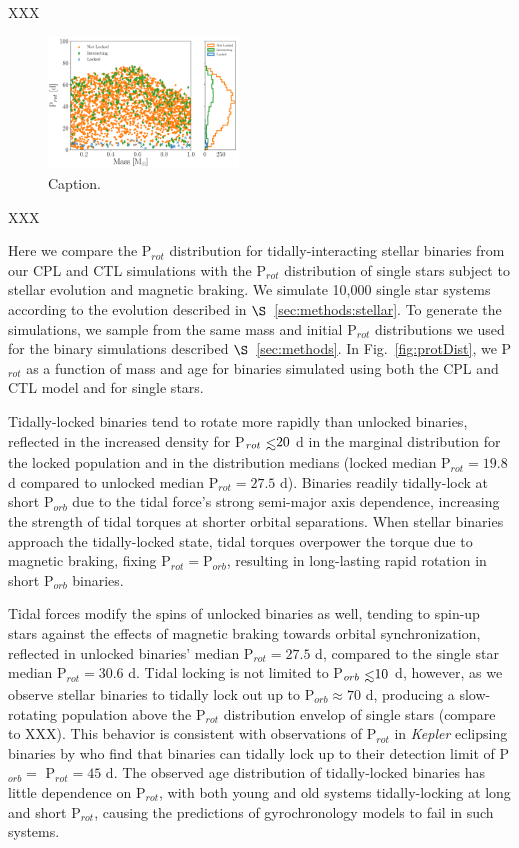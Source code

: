 \documentclass[twocolumn]{aastex61}
\def\lsim{~\rlap{$<$}{\lower 1.0ex\hbox{$\sim$}}}
\newcommand{\kepler}[0]{\textit{Kepler}\xspace}
\begin{document}
XXX

\begin{figure}
	\includegraphics[width=0.45\textwidth]{../Plots/lockedCTL.pdf}
   \caption{Caption.}%
    \label{fig:lockedCTL}%
\end{figure}

XXX

Here we compare the P$_{rot}$ distribution for tidally-interacting stellar binaries from our CPL and CTL simulations with the P$_{rot}$ distribution of single stars subject to stellar evolution and magnetic braking.  We simulate 10,000 single star systems according to the evolution described in $\S$~\ref{sec:methods:stellar}.  To generate the simulations, we sample from the same mass and initial P$_{rot}$ distributions we used for the binary simulations described $\S$~\ref{sec:methods}. In Fig.~\ref{fig:protDist}, we P$_{rot}$ as a function of mass and age for binaries simulated using both the CPL and CTL model and for single stars. 

Tidally-locked binaries tend to rotate more rapidly than unlocked binaries, reflected in the increased density for P$_{rot} \lsim 20$ d in the marginal distribution for the locked population and in the distribution medians (locked median P$_{rot} = 19.8$ d compared to unlocked median P$_{rot} = 27.5$ d). Binaries readily tidally-lock at short P$_{orb}$ due to the tidal force's strong semi-major axis dependence, increasing the strength of tidal torques at shorter orbital separations. When stellar binaries approach the tidally-locked state, tidal torques overpower the torque due to magnetic braking, fixing P$_{rot} = $P$_{orb}$, resulting in long-lasting rapid rotation in short P$_{orb}$ binaries. 

Tidal forces modify the spins of unlocked binaries as well, tending to spin-up stars against the effects of magnetic braking towards orbital synchronization, reflected in unlocked binaries' median P$_{rot} = 27.5$ d, compared to the single star median P$_{rot} = 30.6$ d. Tidal locking is not limited to P$_{orb} \lsim 10$ d, however, as we observe stellar binaries to tidally lock out up to P$_{orb} \approx 70$ d, producing a slow-rotating population above the P$_{rot}$ distribution envelop of single stars (compare to XXX). This behavior is consistent with observations of P$_{rot}$ in \kepler eclipsing binaries by \citet{Lurie2017} who find that binaries can tidally lock up to their detection limit of P$_{orb} = $ P$_{rot} = 45$ d. The observed age distribution of tidally-locked binaries has little dependence on P$_{rot}$, with both young and old systems tidally-locking at long and short P$_{rot}$, causing the predictions of gyrochronology models to fail in such systems. 
\end{document}
